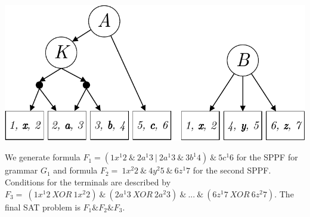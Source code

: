 \includegraphics[scale=.6]{./pic/trees2.pdf}


We generate formula $F_1 = (1 x^1 2\ \&\ 2 a^1 3\ |\ 2 a^1 3\ \&\ 3 b^1 4)\ \&\ 5 c^1 6$  %
for the SPPF for grammar $G_1$
and formula $F_2 = \ 1 x^2 2\ \&\ 4 y^2 5\ \&\ 6 z^1 7$ %
for the second SPPF. Conditions for the 
terminals are described by $F_3 = \ (1 x^1 2\ XOR\ 1 x^2 2)\ \&\ (2 a^1 3\ XOR\ 2 a^2 3)\ \&\ ...\ \&\ (6 z^1 7\ XOR\ 6 z^2 7)$.
The final SAT problem is $F_1\&F_2\&F_3$.














